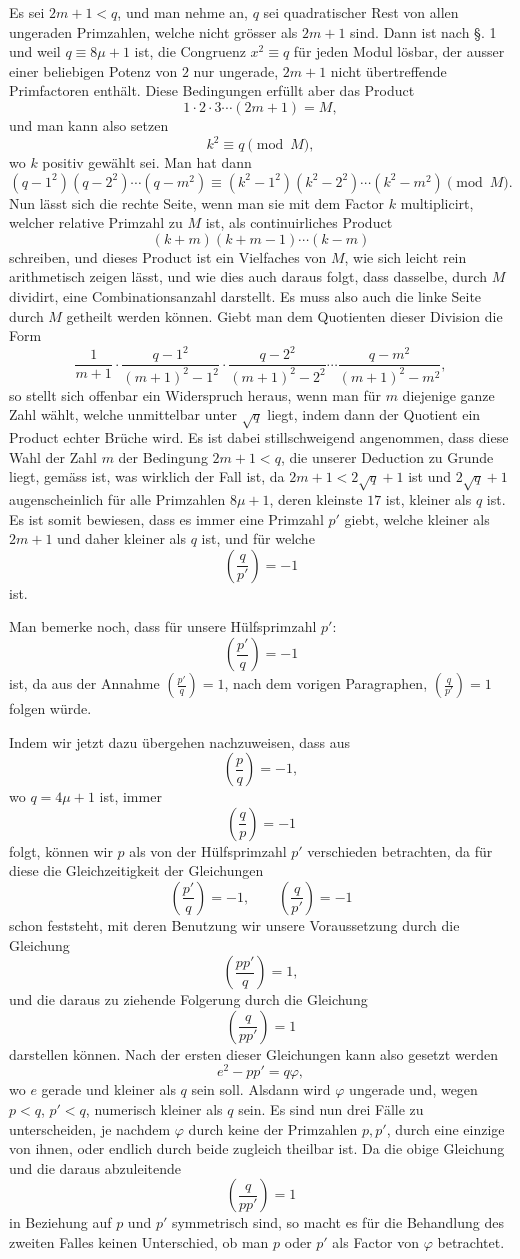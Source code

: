 \documentclass[11pt]{article}
\newcommand{\J}[2]{\left(\frac{#1}{#2}\right)}
\begin{document}
Es sei $2m+1<q$, und man nehme an, $q$ sei quadratischer Rest von allen ungeraden Primzahlen, welche nicht grösser als $2m+1$ sind. Dann ist nach \S. 1 und weil $q\equiv 8\mu+1$ ist, die Congruenz $x^2\equiv q$ für jeden Modul lösbar, der ausser einer beliebigen Potenz von $2$ nur ungerade, $2m+1$ nicht übertreffende Primfactoren enthält. Diese Bedingungen erfüllt aber das Product
\[
 1\cdot2\cdot3\cdots(2m+1)=M,
\]
und man kann also setzen
\[
 k^2\equiv q\pmod M,
\]
wo $k$ positiv gewählt sei. Man hat dann
\[
 (q-1^2)(q-2^2)\cdots(q-m^2)\equiv (k^2-1^2)(k^2-2^2)\cdots(k^2-m^2)\pmod M.
\]
Nun lässt sich die rechte Seite, wenn man sie mit dem Factor $k$ multiplicirt, welcher relative Primzahl zu $M$ ist, als continuirliches Product
\[
 (k+m)(k+m-1)\cdots(k-m)
\]
schreiben, und dieses Product ist ein Vielfaches von $M$, wie sich leicht rein arithmetisch zeigen lässt, und wie dies auch daraus folgt, dass dasselbe, durch $M$ dividirt, eine Combinationsanzahl darstellt. Es muss also auch die linke Seite durch $M$ getheilt werden können. Giebt man dem Quotienten dieser Division die Form
\[
 \frac1{m+1}\cdot \frac{q-1^2}{(m+1)^2-1^2}\cdot
 \frac{q-2^2}{(m+1)^2-2^2}\cdots
 \frac{q-m^2}{(m+1)^2-m^2},
\]
so stellt sich offenbar ein Widerspruch heraus, wenn man für $m$ diejenige ganze Zahl wählt, welche unmittelbar unter $\sqrt q$ liegt, indem dann der Quotient ein Product echter Brüche wird. Es ist dabei stillschweigend angenommen, dass diese Wahl der Zahl $m$ der Bedingung $2m+1<q$, die unserer Deduction zu Grunde liegt, gemäss ist, was wirklich der Fall ist, da $2m+1<2\sqrt q+1$ ist und $2\sqrt q+1$ augenscheinlich für alle Primzahlen $8\mu+1$, deren kleinste $17$ ist, kleiner als $q$ ist. Es ist somit bewiesen, dass es immer eine Primzahl $p'$ giebt, welche kleiner als $2m+1$ und daher kleiner als $q$ ist, und für welche
\[
 \J{q}{p'}=-1
\]
ist.

Man bemerke noch, dass für unsere Hülfsprimzahl $p'$:
\[
 \J{p'}{q}=-1
\]
ist, da aus der Annahme $\J{p'}{q}=1$, nach dem vorigen Paragraphen, $\J{q}{p'}=1$ folgen würde.

Indem wir jetzt dazu übergehen nachzuweisen, dass aus
\[
 \J{p}{q}=-1,
\]
wo $q=4\mu+1$ ist, immer
\[
 \J{q}{p}=-1
\]
folgt, können wir $p$ als von der Hülfsprimzahl $p'$ verschieden betrachten, da für diese die Gleichzeitigkeit der Gleichungen
\[
 \J{p'}{q}=-1,\qquad \J{q}{p'}=-1
\]
schon feststeht, mit deren Benutzung wir unsere Voraussetzung durch die Gleichung
\[
 \J{pp'}{q}=1,
\]
und die daraus zu ziehende Folgerung durch die Gleichung
\[
 \J{q}{pp'}=1
\]
darstellen können. Nach der ersten dieser Gleichungen kann also gesetzt werden
\[
 e^2-pp'=q\varphi,
\]
wo $e$ gerade und kleiner als $q$ sein soll. Alsdann wird $\varphi$ ungerade und, wegen $p<q$, $p'<q$, numerisch kleiner als $q$ sein. Es sind nun drei Fälle zu unterscheiden, je nachdem $\varphi$ durch keine der Primzahlen $p,p'$, durch eine einzige von ihnen, oder endlich durch beide zugleich theilbar ist. Da die obige Gleichung und die daraus abzuleitende
\[
 \J{q}{pp'}=1
\]
in Beziehung auf $p$ und $p'$ symmetrisch sind, so macht es für die Behandlung des zweiten Falles keinen Unterschied, ob man $p$ oder $p'$ als Factor von $\varphi$ betrachtet.
\end{document}
